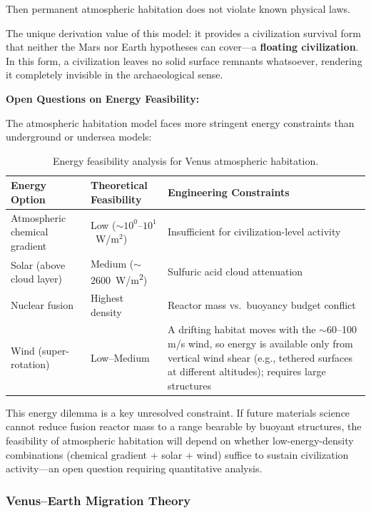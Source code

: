 \documentclass[aps,prd,twocolumn,superscriptaddress,nofootinbib]{revtex4-2}
\begin{document}
Then permanent atmospheric habitation does not violate known physical laws.

The unique derivation value of this model: it provides a civilization survival form that neither the Mars nor Earth hypotheses can cover---a \textbf{floating civilization}. In this form, a civilization leaves no solid surface remnants whatsoever, rendering it completely invisible in the archaeological sense.

\textbf{Open Questions on Energy Feasibility:}

The atmospheric habitation model faces more stringent energy constraints than underground or undersea models:

\begin{table}[htbp]
\caption{Energy feasibility analysis for Venus atmospheric habitation.}
\label{tab:venus-energy}
\footnotesize
\begin{tabular}{P{0.242\textwidth}P{0.226\textwidth}P{0.429\textwidth}}
\toprule
Energy Option & Theoretical Feasibility & Engineering Constraints \\
\midrule
Atmospheric chemical gradient & Low (${\sim}10^{0}$--$10^{1}$~W/m$^2$) & Insufficient for civilization-level activity \\
Solar (above cloud layer) & Medium (${\sim}$\SI{2600}{W/m^2}) & Sulfuric acid cloud attenuation \\
Nuclear fusion & Highest density & Reactor mass vs.\ buoyancy budget conflict \\
Wind (super-rotation) & Low--Medium & A drifting habitat moves with the ${\sim}$60--100 m/s wind, so energy is available only from vertical wind shear (e.g., tethered surfaces at different altitudes); requires large structures \\
\bottomrule
\end{tabular}
\end{table}

This energy dilemma is a key unresolved constraint. If future materials science cannot reduce fusion reactor mass to a range bearable by buoyant structures, the feasibility of atmospheric habitation will depend on whether low-energy-density combinations (chemical gradient + solar + wind) suffice to sustain civilization activity---an open question requiring quantitative analysis.

\subsubsection{Venus--Earth Migration Theory}\label{sec:venus-earth-migration}
\end{document}
